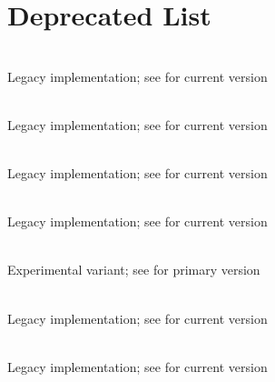 \chapter{Deprecated List }
\hypertarget{deprecated}{}\label{deprecated}

\begin{DoxyRefList}
\item[{\parbox[t]{\linewidth}{File \doxylink{old-he_2benchmark_8cpp}{benchmark.cpp} }}]\hfill \\
\label{deprecated__deprecated000001}%
%
Legacy implementation; see  for current version 
\item[{\parbox[t]{\linewidth}{File \doxylink{old-he_2clustering_8cpp}{clustering.cpp} }}]\hfill \\
\label{deprecated__deprecated000002}%
%
Legacy implementation; see  for current version 
\item[{\parbox[t]{\linewidth}{File \doxylink{old-he_2data-ingestion_8cpp}{data-\/ingestion.cpp} }}]\hfill \\
\label{deprecated__deprecated000003}%
%
Legacy implementation; see  for current version 
\item[{\parbox[t]{\linewidth}{File \doxylink{old-he_2encryption_8cpp}{encryption.cpp} }}]\hfill \\
\label{deprecated__deprecated000004}%
%
Legacy implementation; see  for current version 
\item[{\parbox[t]{\linewidth}{File \doxylink{main1_8cpp}{main1.cpp} }}]\hfill \\
\label{deprecated__deprecated000007}%
%
Experimental variant; see  for primary version 
\item[{\parbox[t]{\linewidth}{File \doxylink{old-he_2mpc__interface_8cpp}{mpc\+\_\+interface.cpp} }}]\hfill \\
\label{deprecated__deprecated000005}%
%
Legacy implementation; see  for current version 
\item[{\parbox[t]{\linewidth}{File \doxylink{old-he_2scheme-selection_8cpp}{scheme-\/selection.cpp} }}]\hfill \\
\label{deprecated__deprecated000006}%
%
Legacy implementation; see  for current version
\end{DoxyRefList}
